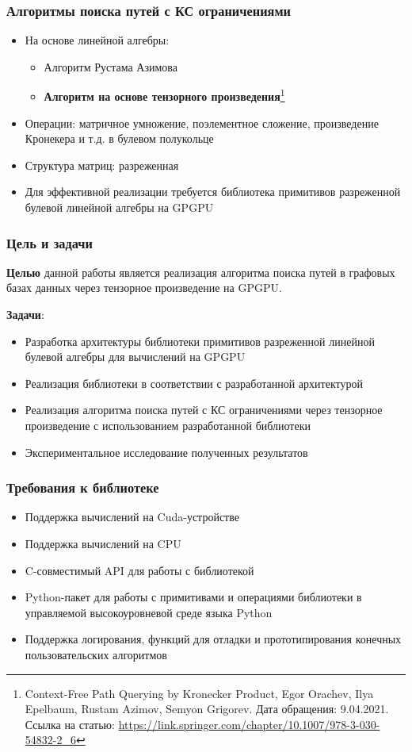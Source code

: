 \documentclass[aspectratio=169,xcolor=table,english]{beamer}
\begin{document}
\begin{frame}[fragile] \frametitle{Алгоритмы поиска путей с КС ограничениями}
    \begin{itemize}
        \item На основе линейной алгебры:
        {
        \begin{itemize}
            \item Алгоритм Рустама Азимова
            \item \textbf{Алгоритм на основе тензорного произведения}\footnote{Context-Free Path Querying by Kronecker Product, Egor Orachev, Ilya Epelbaum, Rustam  Azimov, Semyon Grigorev. Дата обращения: 9.04.2021. Ссылка на статью: \url{https://link.springer.com/chapter/10.1007/978-3-030-54832-2\_6}}
        \end{itemize}
        }
        \item Операции: матричное умножение, поэлементное сложение, произведение Кронекера и т.д. в булевом полукольце
        \item Структура матриц: разреженная
        \item Для эффективной реализации требуется библиотека примитивов разреженной булевой линейной алгебры на GPGPU
    \end{itemize}
\end{frame}

\begin{frame}[fragile] \frametitle{Цель и задачи}
    \textbf{Целью} данной работы является реализация алгоритма поиска путей в графовых базах данных через тензорное произведение на GPGPU.
    
    \textbf{Задачи}:
    \begin{itemize}
        \item Разработка архитектуры библиотеки примитивов разреженной линейной булевой алгебры для вычислений на GPGPU
        \item Реализация библиотеки в соответствии с разработанной архитектурой
        \item Реализация алгоритма поиска путей с КС ограничениями через тензорное произведение с использованием разработанной библиотеки
        \item Экспериментальное исследование полученных результатов
    \end{itemize}
\end{frame}

\begin{frame}[fragile] \frametitle{Требования к библиотеке}
    \begin{itemize}
        \item Поддержка вычислений на Cuda-устройстве
        \item Поддержка вычислений на CPU
        \item C-совместимый API для работы с библиотекой
        \item Python-пакет для работы с примитивами и операциями библиотеки в управляемой высокоуровневой среде языка Python
        \item Поддержка логирования, функций для отладки и прототипирования конечных пользовательских алгоритмов
    \end{itemize}
\end{frame}
\end{document}
